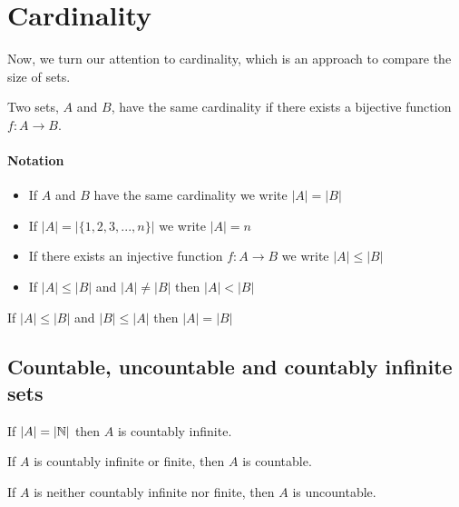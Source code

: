 \section{Cardinality}

Now, we turn our attention to cardinality, which is an approach to compare the size of sets.

\begin{definition}[Cardinality]
    Two sets, $A$ and $B$, have the same cardinality if there exists a bijective function $f: A \to B$.
\end{definition}

\paragraph{Notation}

\begin{itemize}
    \item If $A$ and $B$ have the same cardinality we write $|A| = |B|$
    \item If $|A| = |\{ 1, 2, 3, ..., n\}|$ we write $|A| = n$
    \item If there exists an injective function $f: A \to B$ we write $|A| \leq |B|$
    \item If $|A| \leq |B|$ and $|A| \neq |B|$ then $|A| < |B|$
\end{itemize}

\begin{theorem}
    If $|A| \leq |B|$ and $|B| \leq |A|$ then $|A| = |B|$
\end{theorem}

\subsection{Countable, uncountable and countably infinite sets}

\begin{definition}
    If $|A| = |\mathbb{N}|$ then $A$ is countably infinite.
\end{definition}

\begin{definition}
    If $A$ is countably infinite or finite, then $A$ is countable.
\end{definition}

\begin{definition}
    If $A$ is neither countably infinite nor finite, then $A$ is uncountable.
\end{definition}

